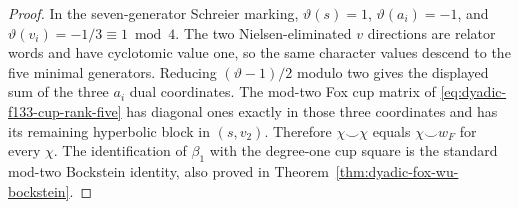 \documentclass[11pt]{article}
\theoremstyle{definition}
\begin{document}
\begin{proof}
In the
seven-generator
Schreier marking,
$\vartheta(s)=1$,
$\vartheta(a_i)=-1$,
and
$\vartheta(v_i)=-1/3
\equiv1\bmod4$.
The two
Nielsen-eliminated
$v$ directions
are relator
words and have
cyclotomic value
one, so the
same character
values descend
to the five
minimal generators.
Reducing
$(\vartheta-1)/2$
modulo two gives
the displayed
sum of the
three $a_i$
dual coordinates.
The mod-two
Fox cup matrix
of
\eqref{eq:dyadic-f133-cup-rank-five}
has diagonal
ones exactly
in those
three coordinates
and has its
remaining
hyperbolic block
in $(s,v_2)$.
Therefore
$\chi\smile\chi$
equals
$\chi\smile w_F$
for every $\chi$.
The identification
of $\beta_1$
with the
degree-one cup
square is
the standard
mod-two
Bockstein identity,
also proved in
Theorem~\ref{thm:dyadic-fox-wu-bockstein}.
\end{proof}
\end{document}
